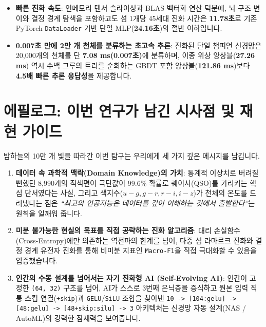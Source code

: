\documentclass[11pt,a4paper]{article}
\begin{document}
\begin{itemize}[leftmargin=16pt, itemsep=2pt]
  \item \textbf{빠른 진화 속도}: 인메모리 텐서 슬라이싱과 BLAS 벡터화 연산 덕분에, 뇌 구조 변이와 결정 경계 탐색을 포함하고도 섬 1개당 45세대 진화 시간은 \textbf{11.78초}로 기존 PyTorch \texttt{DataLoader} 기반 단일 MLP(\textbf{24.16초})의 절반 이하입니다.
  \item \textbf{0.007초 만에 2만 개 천체를 분류하는 초고속 추론}: 진화된 단일 챔피언 신경망은 20,000개의 천체를 단 \textbf{7.08 ms(0.007초)}에 분류하며, 이종 위상 앙상블(\textbf{27.26 ms}) 역시 수백 그루의 트리를 순회하는 GBDT 포함 앙상블(\textbf{121.86 ms})보다 \textbf{4.5배 빠른 추론 응답성}을 제공합니다.
\end{itemize}

\section{에필로그: 이번 연구가 남긴 시사점 및 재현 가이드}

밤하늘의 10만 개 빛을 따라간 이번 탐구는 우리에게 세 가지 깊은 메시지를 남깁니다.

\begin{enumerate}[leftmargin=18pt, itemsep=3pt]
  \item \textbf{데이터 속 과학적 맥락(Domain Knowledge)의 가치}: 통계적 이상치로 버려질 뻔했던 8,990개의 적색편이 극단값이 99.6\% 확률로 퀘이사(QSO)를 가리키는 핵심 단서였다는 사실, 그리고 색지수($u-g, g-r, r-i, i-z$)가 천체의 온도를 드러냈다는 점은 \emph{``최고의 인공지능은 데이터를 깊이 이해하는 것에서 출발한다''}는 원칙을 일깨워 줍니다.
  \item \textbf{미분 불가능한 현실의 목표를 직접 공략하는 진화 알고리즘}: 대리 손실함수(Cross-Entropy)에만 의존하는 역전파의 한계를 넘어, 다중 섬 라마르크 진화와 결정 경계 유전자 진화를 통해 비미분 지표인 \texttt{Macro-F1}을 직접 극대화할 수 있음을 입증했습니다.
  \item \textbf{인간의 수동 설계를 넘어서는 자기 진화형 AI (Self-Evolving AI)}: 인간이 고정한 \texttt{(64, 32)} 구조를 넘어, AI가 스스로 3번째 은닉층을 증식하고 원본 입력 직통 스킵 연결(\texttt{+skip})과 \texttt{GELU}/\texttt{SiLU} 조합을 찾아낸 \texttt{10 -> [104:gelu] -> [48:gelu] -> [48+skip:silu] -> 3} 아키텍처는 신경망 자동 설계(NAS / AutoML)의 강력한 잠재력을 보여줍니다.
\end{enumerate}
\end{document}

